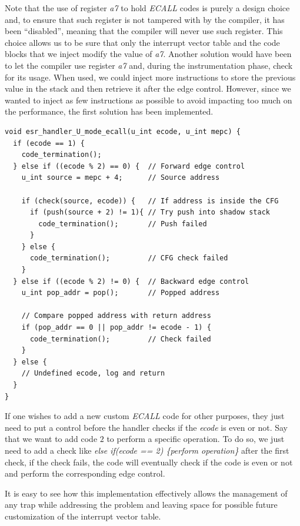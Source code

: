 Note that the use of register \textit{a7} to hold \textit{ECALL} codes is purely
a design choice and, to ensure that such register is not tampered with by the
compiler, it has been ``disabled'', meaning that the compiler will never use
such register. This choice allows us to be sure that only the interrupt vector table
and the code blocks that we inject modify the value of \textit{a7}. Another solution
would have been to let the compiler use register \textit{a7} and, during the instrumentation
phase, check for its usage. When used, we could inject more instructions to
store the previous value in the stack and then retrieve it after the edge
control. However, since we wanted to inject as few instructions as possible to
avoid impacting too much on the performance, the first solution has been implemented.
\\
\begin{lstlisting}[style=CStyle, caption = U-mode \textit{ECALL} handler, label={lst:ecallhandler}]
void esr_handler_U_mode_ecall(u_int ecode, u_int mepc) {
  if (ecode == 1) {
    code_termination();
  } else if ((ecode % 2) == 0) {  // Forward edge control
    u_int source = mepc + 4;      // Source address

    if (check(source, ecode)) {   // If address is inside the CFG
      if (push(source + 2) != 1){ // Try push into shadow stack
        code_termination();       // Push failed
      }
    } else {
      code_termination();         // CFG check failed
    }
  } else if ((ecode % 2) != 0) {  // Backward edge control
    u_int pop_addr = pop();       // Popped address

    // Compare popped address with return address
    if (pop_addr == 0 || pop_addr != ecode - 1) {
      code_termination();         // Check failed
    }
  } else {
    // Undefined ecode, log and return
  }
}
\end{lstlisting}

If one wishes to add a new custom \textit{ECALL} code for other purposes, they just
need to put a control before the handler checks if the \textit{ecode} is even or
not. Say that we want to add code $2$ to perform a specific operation. To do so,
we just need to add a check like \textit{else if(ecode == 2) \{perform operation\}}
after the first check, if the check fails, the code will eventually check if the
code is even or not and perform the corresponding edge control.

It is easy to see how this implementation effectively allows the management of
any trap while addressing the problem and leaving space for possible future
customization of the interrupt vector table.

